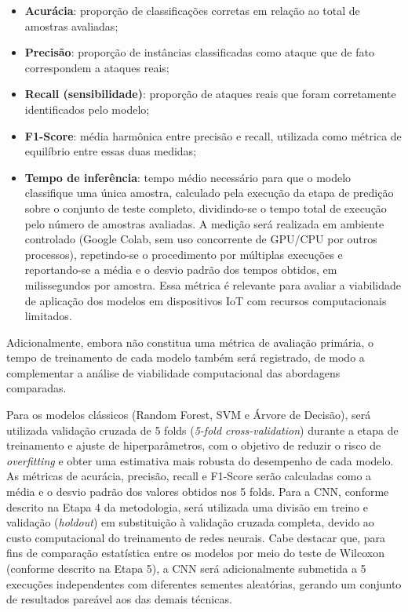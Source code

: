 \begin{itemize}
    \item \textbf{Acurácia}: proporção de classificações corretas em relação ao total de amostras avaliadas;
    \item \textbf{Precisão}: proporção de instâncias classificadas como ataque que de fato correspondem a ataques reais;
    \item \textbf{Recall (sensibilidade)}: proporção de ataques reais que foram corretamente identificados pelo modelo;
    \item \textbf{F1-Score}: média harmônica entre precisão e recall, utilizada como métrica de equilíbrio entre essas duas medidas;
    \item \textbf{Tempo de inferência}: tempo médio necessário para que o modelo classifique uma única amostra, calculado pela execução da etapa de predição sobre o conjunto de teste completo, dividindo-se o tempo total de execução pelo número de amostras avaliadas. A medição será realizada em ambiente controlado (Google Colab, sem uso concorrente de GPU/CPU por outros processos), repetindo-se o procedimento por múltiplas execuções e reportando-se a média e o desvio padrão dos tempos obtidos, em milissegundos por amostra. Essa métrica é relevante para avaliar a viabilidade de aplicação dos modelos em dispositivos IoT com recursos computacionais limitados.
\end{itemize}

Adicionalmente, embora não constitua uma métrica de avaliação primária, o tempo de treinamento de cada modelo também será registrado, de modo a complementar a análise de viabilidade computacional das abordagens comparadas.

Para os modelos clássicos (Random Forest, SVM e Árvore de Decisão), será utilizada validação cruzada de 5 folds (\textit{5-fold cross-validation}) durante a etapa de treinamento e ajuste de hiperparâmetros, com o objetivo de reduzir o risco de \textit{overfitting} e obter uma estimativa mais robusta do desempenho de cada modelo. As métricas de acurácia, precisão, recall e F1-Score serão calculadas como a média e o desvio padrão dos valores obtidos nos 5 folds. Para a CNN, conforme descrito na Etapa 4 da metodologia, será utilizada uma divisão em treino e validação (\textit{holdout}) em substituição à validação cruzada completa, devido ao custo computacional do treinamento de redes neurais. Cabe destacar que, para fins de comparação estatística entre os modelos por meio do teste de Wilcoxon (conforme descrito na Etapa 5), a CNN será adicionalmente submetida a 5 execuções independentes com diferentes sementes aleatórias, gerando um conjunto de resultados pareável aos das demais técnicas.

